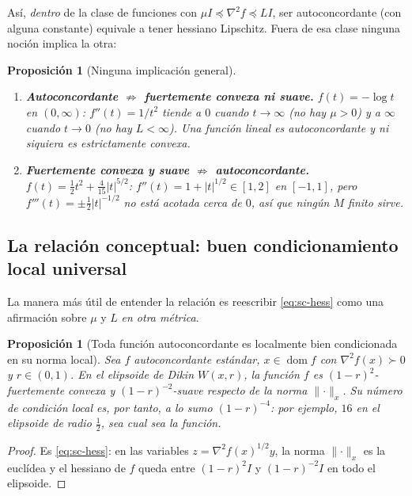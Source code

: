 \documentclass[11pt,a4paper,oneside]{book}
\newtheorem{proposicion}[teorema]{Proposición}
\theoremstyle{definition}
\theoremstyle{remark}
\newcommand{\nrm}[1]{\lVert #1\rVert}
\newcommand{\abs}[1]{\left\lvert #1\right\rvert}
\DeclareMathOperator{\dom}{dom}
\begin{document}
Así, \emph{dentro} de la clase de funciones con $\mu I\preceq\nabla^2 f\preceq LI$, ser autoconcordante (con
alguna constante) equivale a tener hessiano Lipschitz. Fuera de esa clase ninguna noción implica la otra:

\begin{proposicion}[Ninguna implicación general]\label{prop:contraejemplos}
\begin{enumerate}[label=(\alph*)]
  \item \textbf{Autoconcordante $\not\Rightarrow$ fuertemente convexa ni suave.} $f(t)=-\log t$ en $(0,\infty)$:
        $f''(t)=1/t^2$ tiende a $0$ cuando $t\to\infty$ (no hay $\mu>0$) y a $\infty$ cuando $t\to0$ (no hay $L<\infty$).
        Una función lineal es autoconcordante y ni siquiera es estrictamente convexa.
  \item \textbf{Fuertemente convexa y suave $\not\Rightarrow$ autoconcordante.} $f(t)=\tfrac12t^2+\tfrac{4}{15}\abs{t}^{5/2}$:
        $f''(t)=1+\abs{t}^{1/2}\in[1,2]$ en $[-1,1]$, pero $f'''(t)=\pm\tfrac12\abs{t}^{-1/2}$ no está acotada
        cerca de $0$, así que ningún $M$ finito sirve.
\end{enumerate}
\end{proposicion}

\subsection{La relación conceptual: buen condicionamiento local universal}

La manera más útil de entender la relación es reescribir \eqref{eq:sc-hess} como una afirmación sobre $\mu$ y
$L$ \emph{en otra métrica}.

\begin{proposicion}[Toda función autoconcordante es localmente bien condicionada en su norma local]\label{prop:cond-local}
Sea $f$ autoconcordante estándar, $x\in\dom f$ con $\nabla^2 f(x)\succ0$ y $r\in(0,1)$. En el elipsoide de
Dikin $W(x,r)$, la función $f$ es $(1-r)^2$-fuertemente convexa y $(1-r)^{-2}$-suave \emph{respecto de la
norma $\nrm{\cdot}_x$}. Su número de condición local es, por tanto, a lo sumo $(1-r)^{-4}$: por ejemplo, $16$
en el elipsoide de radio $\tfrac12$, sea cual sea la función.
\end{proposicion}

\begin{proof}
Es \eqref{eq:sc-hess}: en las variables $z=\nabla^2 f(x)^{1/2}y$, la norma $\nrm{\cdot}_x$ es la euclídea y el
hessiano de $f$ queda entre $(1-r)^2I$ y $(1-r)^{-2}I$ en todo el elipsoide.
\end{proof}
\end{document}
